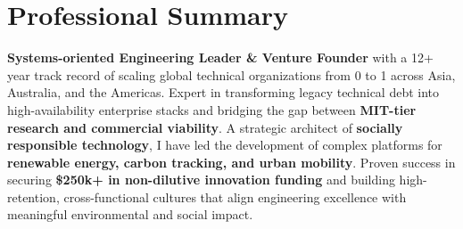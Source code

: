 \section{Professional Summary}
\textbf{Systems-oriented Engineering Leader \& Venture Founder} with
a 12+ year track record of scaling global technical organizations
from 0 to 1 across Asia, Australia, and the Americas. Expert in
transforming legacy technical debt into high-availability enterprise
stacks and bridging the gap between \textbf{MIT-tier research and
commercial viability}. A strategic architect of \textbf{socially
responsible technology}, I have led the development of complex
platforms for \textbf{renewable energy, carbon tracking, and urban
mobility}. Proven success in securing \textbf{\$250k+ in non-dilutive
innovation funding} and building high-retention, cross-functional
cultures that align engineering excellence with meaningful
environmental and social impact.
